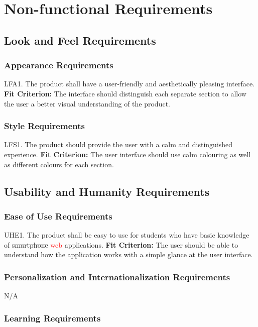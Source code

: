 \documentclass[12pt, titlepage]{article}
\begin{document}
\section{Non-functional Requirements}

\subsection{Look and Feel Requirements}

\subsubsection{Appearance Requirements}

LFA1. The product shall have a user-friendly and aesthetically pleasing interface.
	\textbf{Fit Criterion:} The interface should distinguish each separate section to allow the user a 
better visual understanding of the product.

\subsubsection{Style Requirements}

LFS1. The product should provide the user with a calm and distinguished experience.
	\textbf{Fit Criterion:} The user interface should use calm colouring as well as different colours 
for each section.

\subsection{Usability and Humanity Requirements}

\subsubsection{Ease of Use Requirements}

UHE1. The product shall be easy to use for students who have basic knowledge of \sout{smartphone} \textcolor{red}{web} applications.
	\textbf{Fit Criterion:} The user should be able to understand how the application works with a 
simple glance at the user interface.

\subsubsection{Personalization and Internationalization Requirements}

N/A

\subsubsection{Learning Requirements}
\end{document}
